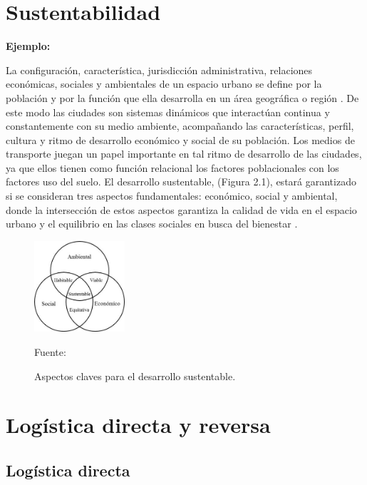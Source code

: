 \section{Sustentabilidad}

{\bf Ejemplo:}\par

La configuración, característica, jurisdicción administrativa, relaciones económicas, sociales y ambientales de un espacio urbano se define por la población y por la función que ella desarrolla en un área geográfica o región \citep{Bugliarello}. De este modo las ciudades son sistemas dinámicos que interactúan continua y constantemente con su medio ambiente, acompañando las características, perfil, cultura y ritmo de desarrollo económico y social de su población. Los medios de transporte juegan un papel importante en tal ritmo de desarrollo de las ciudades, ya que ellos tienen como función relacional los factores poblacionales con los factores uso del suelo.  
\vskip 1cm
El desarrollo sustentable, (Figura 2.1), estará garantizado si se consideran tres aspectos fundamentales: económico, social y ambiental, donde la intersección de estos aspectos garantiza la calidad de vida en el espacio urbano y el equilibrio en las clases sociales en busca del bienestar \citep{Tanguay}.

\begin{figure}[ht]
\begin{center}
\includegraphics[width=0.3\textwidth]{Figura2}
\end{center}
\begin{center}
\vskip -0.5cm
\caption{\small{Aspectos claves para el desarrollo sustentable.}}
{\small{Fuente: \cite{Tanguay}}}
\end{center}
\end{figure}

\section{Logística directa y reversa}

\subsection{Logística directa}

